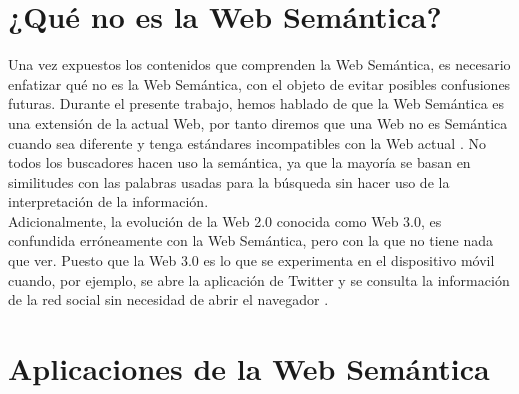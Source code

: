 \section{¿Qué no es la Web Semántica?}

Una vez expuestos los contenidos que comprenden la Web Semántica, es necesario enfatizar qué no es la Web Semántica, con el objeto de evitar posibles confusiones futuras. Durante el presente trabajo, hemos hablado de que la Web Semántica es una extensión de la actual Web, por tanto diremos que una Web no es Semántica cuando sea diferente y tenga estándares incompatibles con la Web actual \cite{introduccion}. No todos los buscadores hacen uso la semántica, ya que la mayoría se basan en similitudes con las palabras usadas para la búsqueda sin hacer uso de la interpretación de la información.\\

Adicionalmente, la evolución de la Web 2.0 conocida como Web 3.0, es confundida erróneamente con la Web Semántica, pero con la que no tiene nada que ver. Puesto que la Web 3.0 es lo que se experimenta en el dispositivo móvil cuando, por ejemplo, se abre la aplicación de Twitter y se consulta la información de la red social sin necesidad de abrir el navegador \cite{web-nueva}.

\section{Aplicaciones de la Web Semántica}


